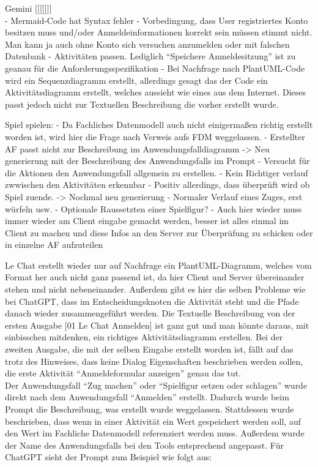 Gemini [[[[]]]\\
    - Mermaid-Code hat Syntax fehler
    - Vorbedingung, dass User registriertes Konto besitzen muss und/oder Anmeldeinformationen korrekt sein müssen stimmt nicht. Man kann ja auch 
    ohne Konto sich versuchen anzumelden oder mit falschen Datenbank
    - Aktivitäten passen. Lediglich ``Speichere Anmeldesitzung'' ist zu geanau für die Anforderungsspezifikation
    - Bei Nachfrage nach PlantUML-Code wird ein Sequenzdiagramm erstellt, allerdings gesagt das der Code ein Aktivitätsdiagramm
    erstellt, welches aussieht wie eines aus dem Internet. Dieses passt jedoch nicht zur Textuellen Beschreibung die vorher erstellt wurde.
    
    Spiel spielen:
    - Da Fachliches Datenmodell auch nicht einigermaßen richtig erstellt worden ist, wird hier die Frage nach Verweis aufs FDM weggelassen.
    - Erstellter AF passt nicht zur Beschreibung im Anwendungsfalldiagramm
    -> Neu generierung mit der Beschreibung des Anwendungsfalls im Prompt
    - Versucht für die Aktionen den Anwendungsfall allgemein zu erstellen.
    - Kein Richtiger verlauf zwwischen den Aktivitäten erkennbar
    - Positiv allerdings, dass überprüft wird ob Spiel zuende.
    -> Nochmal neu generierung
    - Normaler Verlauf eines Zuges, erst würfeln usw.
    - Optionale Raussetzten einer Spielfigur?
    - Auch hier wieder muss immer wieder am Client eingabe gemacht werden, besser ist alles einmal im Client zu machen und diese Infos an den
    Server zur Überprüfung zu schicken oder in einzelne AF aufzuteilen
 

Le Chat erstellt wieder nur auf Nachfrage ein PlantUML-Diagramm, welches vom Format her auch nicht ganz passend ist, da hier Client und Server übereinander 
stehen und nicht nebeneinander. Außerdem gibt es hier die selben Probleme wie bei ChatGPT, dass im Entscheidungsknoten die Aktivität steht und die Pfade 
danach wieder zusammengeführt werden. Die Textuelle Beschreibung von der ersten Ausgabe [01 Le Chat Anmelden] ist ganz gut und man könnte daraus, mit 
einbisschen mitdenken, ein richtiges Aktivitätsdiagramm erstellen. Bei der zweiten Ausgabe, die mit der selben Eingabe erstellt worden ist, fällt auf 
das trotz des Hinweises, dass keine Dialog Eigenschaften beschrieben werden sollen, die erste Aktivität ``Anmeldeformular anzeigen'' genau das tut.\\

Der Anwendungsfall ``Zug machen'' oder ``Spielfigur setzen oder schlagen'' wurde direkt nach dem Anwendungsfall ``Anmelden'' erstellt. Dadurch wurde
beim Prompt die Beschreibung, was erstellt wurde weggelassen. Stattdessen wurde beschrieben, dass wenn in einer Aktivität ein Wert gespeichert werden
soll, auf den Wert im Fachliche Datenmodell referenziert werden muss. Außerdem wurde der Name des Anwendungsfalls bei den Tools entsprechend angepasst. 
Für ChatGPT sieht der Prompt zum Beispiel wie folgt aus:

